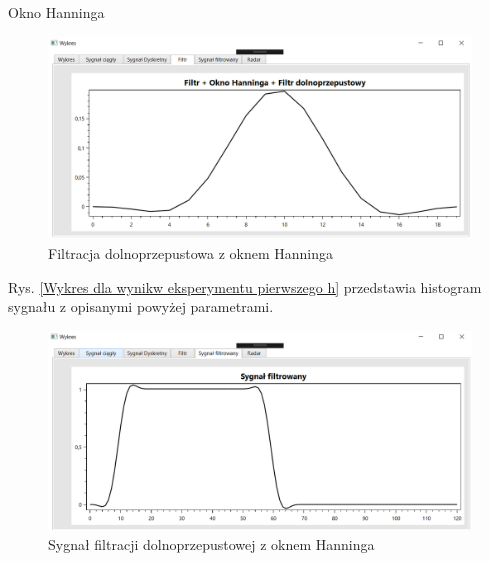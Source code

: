 \documentclass[12pt]{article}
\begin{document}
\newpage
Okno Hanninga
\begin{figure}[h!]
 \centering
 \includegraphics[width=12.3cm]{prostFDOHn.PNG}
 \vspace{-0.3cm}
 \caption{Filtracja dolnoprzepustowa z oknem Hanninga}
 \label{Wykres dla wyników eksperymentu drugiego}
\end{figure}
\newpage
Rys. \ref{Wykres dla wynikw eksperymentu pierwszego h} przedstawia histogram sygnału z opisanymi powyżej parametrami. 
\begin{figure}[h!]
 \centering
 \includegraphics[width=12.3cm]{prostSFDHn.PNG}
 \vspace{-0.3cm}
 \caption{Sygnał filtracji dolnoprzepustowej z oknem Hanninga}
 \label{Histogram dla wyników eksperymentu drugiego}
\end{figure}
\end{document}
